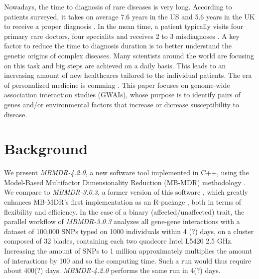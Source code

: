 \documentclass{bmcart}
\begin{document}
Nowadays, the time to diagnosis of rare diseases is very long. According to patients surveyed, it takes on average 7.6 years in the US and 5.6 years in the UK to receive a proper diagnosis \cite{Shire2013}. In the mean time, a patient typically visits four primary care doctors, four specialits and receives 2 to 3 misdiagnoses \cite{Shire2013}. A key factor to reduce the time to diagnosis duration is to better understand the genetic origins of complex diseases. Many scientists around the world are focusing on this task and big steps are achieved on a daily basis. This leads to an increasing amount of new healthcares tailored to the individual patients. The era of personalized medicine is comming \cite{Shastry2006, VantVeer2008, Galas2009, Beevers2012, Lester2013}. This paper focuses on genome-wide association interaction studies (GWAIs), whose purpose is to identify pairs of genes and/or environmental factors that increase or dicrease susceptibility to disease.

\section*{Background}

We present {\em MBMDR-4.2.0}, a new software tool implemented in C++, using the Model-Based Multifactor Dimensionality Reduction (MB-MDR) methodology \cite{Calle2008, Calle2008b, Cattaert2011,Mahachie2012}. We compare to {\em MBMDR-3.0.3}, a former version of this software \cite{VanLishout2013}, which greatly enhances MB-MDR's first implementation as an R-package \cite{Calle2010}, both in terms of flexibility and efficiency. In the case of a binary (affected/unaffected) trait, the parallel workflow of {\em MBMDR-3.0.3} analyzes all gene-gene interactions with a dataset of 100,000 SNPs typed on 1000 individuals within 4 (?) days, on a cluster composed of 32 blades, containing each two quadcore Intel L5420 2.5 GHz. Increasing the amount of SNPs to 1 million approximately multiplies the amount of interactions by 100 and so the computing time. Such a run would thus require about 400(?) days.  {\em MBMDR-4.2.0} performs the same run in 4(?) days.
\end{document}
